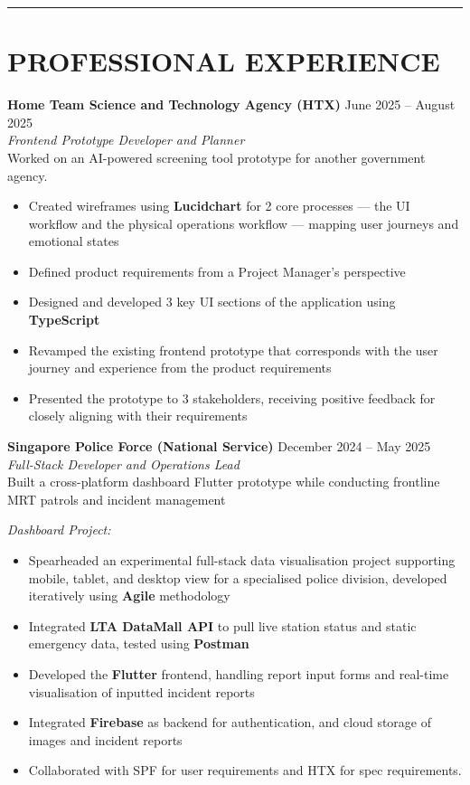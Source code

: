 \documentclass[11pt,a4paper]{article}
\newcommand{\sectionrule}{\noindent\rule{\textwidth}{0.8pt}}
\newcommand{\entrytitle}[2]{%
  \noindent\textbf{#1} \hfill #2\\
}
\newcommand{\entrysub}[1]{%
  \textit{#1}\\
}
\begin{document}
\sectionrule

\section*{PROFESSIONAL EXPERIENCE}
\vspace{2pt}

\entrytitle{Home Team Science and Technology Agency (HTX)}{June 2025 -- August 2025}
\entrysub{Frontend Prototype Developer and Planner}
Worked on an AI-powered screening tool prototype for another government agency.

\begin{itemize}
  \item Created wireframes using \textbf{Lucidchart} for 2 core processes --- the UI workflow and the physical operations workflow --- mapping user journeys and emotional states
  \item Defined product requirements from a Project Manager's perspective
  \item Designed and developed 3 key UI sections of the application using \textbf{TypeScript}
  \item Revamped the existing frontend prototype that corresponds with the user journey and experience from the product requirements
  \item Presented the prototype to 3 stakeholders, receiving positive feedback for closely aligning with their requirements
\end{itemize}

\vspace{4pt}
\entrytitle{Singapore Police Force (National Service)}{December 2024 -- May 2025}
\entrysub{Full-Stack Developer and Operations Lead}
Built a cross-platform dashboard Flutter prototype while conducting frontline MRT patrols and incident management

\textit{Dashboard Project:}
\begin{itemize}
  \item Spearheaded an experimental full-stack data visualisation project supporting mobile, tablet, and desktop view for a specialised police division, developed iteratively using \textbf{Agile} methodology
  \item Integrated \textbf{LTA DataMall API} to pull live station status and static emergency data, tested using \textbf{Postman}
  \item Developed the \textbf{Flutter} frontend, handling report input forms and real-time visualisation of inputted incident reports
  \item Integrated \textbf{Firebase} as backend for authentication, and cloud storage of images and incident reports
  \item Collaborated with SPF for user requirements and HTX for spec requirements.
\end{itemize}
\end{document}
